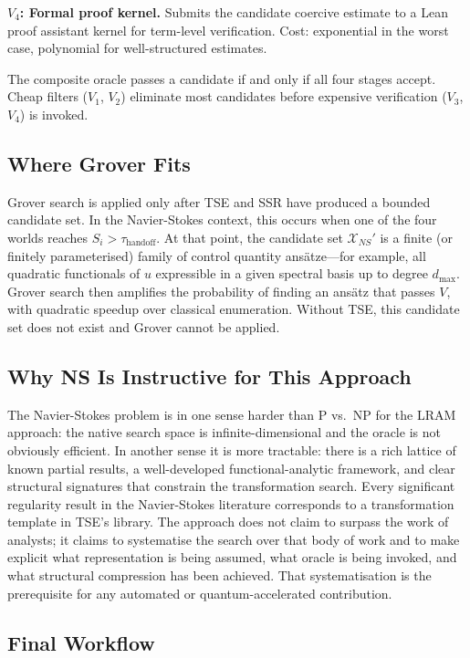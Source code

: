 \textbf{$V_4$: Formal proof kernel.} Submits the candidate coercive estimate to a Lean proof assistant kernel for term-level verification. Cost: exponential in the worst case, polynomial for well-structured estimates.

The composite oracle passes a candidate if and only if all four stages accept. Cheap filters ($V_1$, $V_2$) eliminate most candidates before expensive verification ($V_3$, $V_4$) is invoked.

\subsection{Where Grover Fits}

Grover search is applied only after TSE and SSR have produced a bounded candidate set. In the Navier-Stokes context, this occurs when one of the four worlds reaches $S_i > \tau_{\text{handoff}}$. At that point, the candidate set $\mathcal{X}_{NS}'$ is a finite (or finitely parameterised) family of control quantity ans\"{a}tze---for example, all quadratic functionals of $u$ expressible in a given spectral basis up to degree $d_{\max}$. Grover search then amplifies the probability of finding an ans\"{a}tz that passes $V$, with quadratic speedup over classical enumeration. Without TSE, this candidate set does not exist and Grover cannot be applied.

\subsection{Why NS Is Instructive for This Approach}

The Navier-Stokes problem is in one sense harder than P vs.\ NP for the LRAM approach: the native search space is infinite-dimensional and the oracle is not obviously efficient. In another sense it is more tractable: there is a rich lattice of known partial results, a well-developed functional-analytic framework, and clear structural signatures that constrain the transformation search. Every significant regularity result in the Navier-Stokes literature corresponds to a transformation template in TSE's library. The approach does not claim to surpass the work of analysts; it claims to systematise the search over that body of work and to make explicit what representation is being assumed, what oracle is being invoked, and what structural compression has been achieved. That systematisation is the prerequisite for any automated or quantum-accelerated contribution.

\subsection{Final Workflow}


